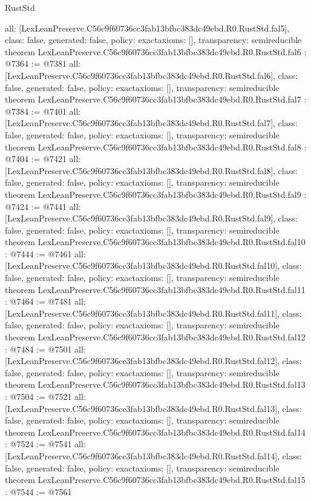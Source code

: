 \begin{lexlean}{RustStd}
\begin{coremodule}
{  all: [LexLeanPreserve.C56c9f60736cc3fab13bfbc383dc49ebd.R0.RustStd.fal5],
  class: false,
  generated: false,
  policy: exact{axioms: []},
  transparency: semireducible
}
theorem LexLeanPreserve.C56c9f60736cc3fab13bfbc383dc49ebd.R0.RustStd.fal6 : @7364 := @7381 {
  all: [LexLeanPreserve.C56c9f60736cc3fab13bfbc383dc49ebd.R0.RustStd.fal6],
  class: false,
  generated: false,
  policy: exact{axioms: []},
  transparency: semireducible
}
theorem LexLeanPreserve.C56c9f60736cc3fab13bfbc383dc49ebd.R0.RustStd.fal7 : @7384 := @7401 {
  all: [LexLeanPreserve.C56c9f60736cc3fab13bfbc383dc49ebd.R0.RustStd.fal7],
  class: false,
  generated: false,
  policy: exact{axioms: []},
  transparency: semireducible
}
theorem LexLeanPreserve.C56c9f60736cc3fab13bfbc383dc49ebd.R0.RustStd.fal8 : @7404 := @7421 {
  all: [LexLeanPreserve.C56c9f60736cc3fab13bfbc383dc49ebd.R0.RustStd.fal8],
  class: false,
  generated: false,
  policy: exact{axioms: []},
  transparency: semireducible
}
theorem LexLeanPreserve.C56c9f60736cc3fab13bfbc383dc49ebd.R0.RustStd.fal9 : @7424 := @7441 {
  all: [LexLeanPreserve.C56c9f60736cc3fab13bfbc383dc49ebd.R0.RustStd.fal9],
  class: false,
  generated: false,
  policy: exact{axioms: []},
  transparency: semireducible
}
theorem LexLeanPreserve.C56c9f60736cc3fab13bfbc383dc49ebd.R0.RustStd.fal10 : @7444 := @7461 {
  all: [LexLeanPreserve.C56c9f60736cc3fab13bfbc383dc49ebd.R0.RustStd.fal10],
  class: false,
  generated: false,
  policy: exact{axioms: []},
  transparency: semireducible
}
theorem LexLeanPreserve.C56c9f60736cc3fab13bfbc383dc49ebd.R0.RustStd.fal11 : @7464 := @7481 {
  all: [LexLeanPreserve.C56c9f60736cc3fab13bfbc383dc49ebd.R0.RustStd.fal11],
  class: false,
  generated: false,
  policy: exact{axioms: []},
  transparency: semireducible
}
theorem LexLeanPreserve.C56c9f60736cc3fab13bfbc383dc49ebd.R0.RustStd.fal12 : @7484 := @7501 {
  all: [LexLeanPreserve.C56c9f60736cc3fab13bfbc383dc49ebd.R0.RustStd.fal12],
  class: false,
  generated: false,
  policy: exact{axioms: []},
  transparency: semireducible
}
theorem LexLeanPreserve.C56c9f60736cc3fab13bfbc383dc49ebd.R0.RustStd.fal13 : @7504 := @7521 {
  all: [LexLeanPreserve.C56c9f60736cc3fab13bfbc383dc49ebd.R0.RustStd.fal13],
  class: false,
  generated: false,
  policy: exact{axioms: []},
  transparency: semireducible
}
theorem LexLeanPreserve.C56c9f60736cc3fab13bfbc383dc49ebd.R0.RustStd.fal14 : @7524 := @7541 {
  all: [LexLeanPreserve.C56c9f60736cc3fab13bfbc383dc49ebd.R0.RustStd.fal14],
  class: false,
  generated: false,
  policy: exact{axioms: []},
  transparency: semireducible
}
theorem LexLeanPreserve.C56c9f60736cc3fab13bfbc383dc49ebd.R0.RustStd.fal15 : @7544 := @7561 {
}
\end{coremodule}
\end{lexlean}
